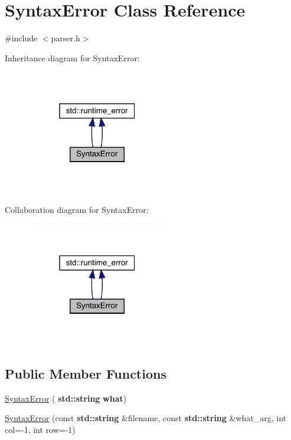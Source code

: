 \hypertarget{class_syntax_error}{}\section{Syntax\+Error Class Reference}
\label{class_syntax_error}


{\ttfamily \#include $<$parser.\+h$>$}



Inheritance diagram for Syntax\+Error\+:
\nopagebreak
\begin{figure}[H]
\begin{center}
\leavevmode
\includegraphics[width=175pt]{class_syntax_error__inherit__graph}
\end{center}
\end{figure}


Collaboration diagram for Syntax\+Error\+:
\nopagebreak
\begin{figure}[H]
\begin{center}
\leavevmode
\includegraphics[width=175pt]{class_syntax_error__coll__graph}
\end{center}
\end{figure}
\subsection*{Public Member Functions}
\begin{DoxyCompactItemize}
\item 
\hyperlink{class_syntax_error_a9da44f87a053ae6c01a0504a67d6dd9b}{Syntax\+Error} (\textbf{ std\+::string} \textbf{ what})
\item 
\hyperlink{class_syntax_error_a16dc968369bcbe16544f01e53dfd97d0}{Syntax\+Error} (const \textbf{ std\+::string} \&filename, const \textbf{ std\+::string} \&what\+\_\+arg, int col=-\/1, int row=-\/1)
\end{DoxyCompactItemize}


